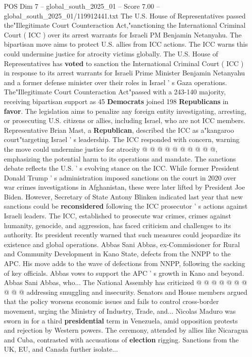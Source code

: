 \begin{textsample}{POS Dim 7 – global\_south\_2025\_01 – Score 7.00 – global\_south\_2025\_01/119912441.txt}  \label{ex:f7_pos_340}
The U.S.
House of Representatives passed the"Illegitimate Court Counteraction Act,"sanctioning the International Criminal Court ( ICC ) over its arrest warrants for Israeli PM Benjamin Netanyahu.
The bipartisan move aims to protect U.S. allies from ICC actions.
The ICC warns this could undermine justice for atrocity victims globally.
The U.S.
House of Representatives has \textbf{voted} to sanction the International Criminal Court ( ICC ) in response to its arrest warrants for Israeli Prime Minister Benjamin Netanyahu and a former defense minister over their roles in Israel ' s Gaza operations.
The"Illegitimate Court Counteraction Act"passed with a 243-140 majority, receiving bipartisan support as 45 \textbf{Democrats} joined 198 \textbf{Republicans} in \textbf{favor}.
The legislation aims to penalize any foreign entity investigating, arresting, or prosecuting U.S. citizens or allies, including Israel, who are not ICC members.
Representative Brian Mast, a \textbf{Republican}, described the ICC as a"kangaroo court"targeting Israel ' s leadership.
The ICC responded with concern, warning the move could undermine justice for atrocity @ @ @ @ @ @ @ @ @ @, emphasizing the potential harm to its operations and mandate.
The sanctions debate reflects the U.S. ' s evolving stance on the ICC.
While former President Donald Trump ' s administration imposed sanctions on the court in 2020 over war crimes investigations in Afghanistan, these were later lifted by President Joe Biden.
However, Secretary of State Antony Blinken indicated last year that new sanctions could be \textbf{reconsidered} following the ICC prosecutor ' s actions against Israeli leaders.
The ICC, established to prosecute war crimes, crimes against humanity, genocide, and aggression, has faced criticism and challenges to its authority.
Its president recently warned that such measures could jeopardize its existence and global operations.
Abbas Sani Abbas, ex-Commissioner for Rural and Community Development in Kano State, defects from the NNPP to the APC.
His move adds to the wave of defections from NNPP, following the sacking of key officials.
Abbas vows to support the APC ' s growth in Kano and beyond.
Abbas Sani Abbas, who...
The National Assembly has criticized @ @ @ @ @ @ @ @ @ @ addressing smuggling and insecurity.
Senators and House members argued that the policy worsens economic issues and fails to control cross-border movement, urging the Ministry of Industry, Trade, and...
Nicolas Maduro was sworn in for a third \textbf{presidential} term in Venezuela, amid opposition protests and rejection by Western powers.
The ceremony, attended by allies like Nicaragua and Cuba, contrasted with accusations of \textbf{election} rigging.
Sanctions from the UK, EU, and Canada further isolate...

\end{textsample}
